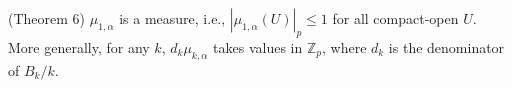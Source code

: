 (Theorem 6) $\mu_{1,\alpha}$ is a measure, i.e., $|\mu_{1,\alpha}(U)|_p \leq 1$ for all compact-open $U$. More generally, for any $k$, $d_k \mu_{k,\alpha}$ takes values in $\mathbb{Z}_p$, where $d_k$ is the denominator of $B_k/k$.